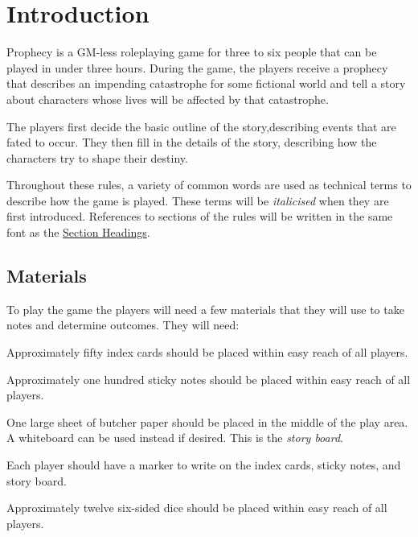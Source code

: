 \documentclass[12pt, a5paper, parskip=half-]{scrartcl}
\begin{document}
\newpage


\raggedright
\section*{Introduction} \label{section:introduction}
Prophecy is a GM-less roleplaying game for three to six people that can be played in under three hours.
During the game, the players receive a prophecy that describes an impending catastrophe for some fictional world and tell a story about characters whose lives will be affected by that catastrophe. 

The players first decide the basic outline of the story,describing events that are fated to occur.  They then fill in the details of the story, describing how the characters try to shape their destiny.

Throughout these rules, a variety of common words are used as technical terms to describe how the game is played.
These terms will be \emph{italicised} when they are first introduced.
References to sections of the rules will be written in the same font as the \hyperref[section:introduction]{\cinzel \small Section Headings}.

\subsection*{Materials} \label{subsection:materials}
To play the game the players will need a few materials that they will use to take notes and determine outcomes. They will need:
\begin{description}[labelindent=0.25cm, leftmargin=\widthof{\hspace{0.25cm}\textbullet\space}, font=\normalfont\textbullet\bfseries\space]
	\item[Index Cards:] Approximately fifty index cards should be placed within easy reach of all players. 
	\item[Sticky Notes:] Approximately one hundred sticky notes should be placed within easy reach of all players.
	\item[Butcher Paper:] One large sheet of butcher paper should be placed in the middle of the play area.  A whiteboard can be used instead if desired. This is the \emph{story board}. 
	\item[Markers:] Each player should have a marker to write on the index cards, sticky notes, and story board.
	\item[Dice:] Approximately twelve six-sided dice should be placed within easy reach of all players. 
\end{description}
\end{document}
